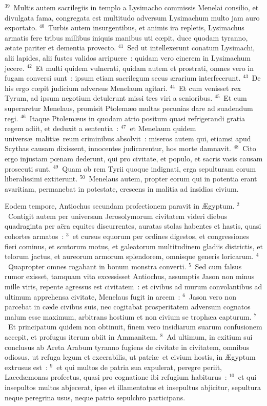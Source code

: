 ${}^{39}$~Multis autem sacrilegiis in templo a Lysimacho commissis Menelai consilio, et divulgata fama, congregata est multitudo adversum Lysimachum multo jam auro exportato.
${}^{40}$~Turbis autem insurgentibus, et animis ira repletis, Lysimachus armatis fere tribus millibus iniquis manibus uti cœpit, duce quodam tyranno, \ae tate pariter et dementia provecto.
${}^{41}$~Sed ut intellexerunt conatum Lysimachi, alii lapides, alii fustes validos arripuere~: quidam vero cinerem in Lysimachum jecere.
${}^{42}$~Et multi quidem vulnerati, quidam autem et prostrati, omnes vero in fugam conversi sunt~: ipsum etiam sacrilegum secus \ae rarium interfecerunt.
${}^{43}$~De his ergo cœpit judicium adversus Menelaum agitari.
${}^{44}$~Et cum venisset rex Tyrum, ad ipsum negotium detulerunt missi tres viri a senioribus.
${}^{45}$~Et cum superaretur Menelaus, promisit Ptolem\ae o multas pecunias dare ad suadendum regi.
${}^{46}$~Itaque Ptolem\ae us in quodam atrio positum quasi refrigerandi gratia regem adiit, et deduxit a sententia~:
${}^{47}$~et Menelaum quidem univers\ae\ maliti\ae\ reum criminibus absolvit~: miseros autem qui, etiamsi apud Scythas causam dixissent, innocentes judicarentur, hos morte damnavit.
${}^{48}$~Cito ergo injustam pœnam dederunt, qui pro civitate, et populo, et sacris vasis causam prosecuti sunt.
${}^{49}$~Quam ob rem Tyrii quoque indignati, erga sepulturam eorum liberalissimi extiterunt.
${}^{50}$~Menelaus autem, propter eorum qui in potentia erant avaritiam, permanebat in potestate, crescens in malitia ad insidias civium.

\bchapter
\lettrine[lines=3,image=true,loversize=0.05,lraise=-0.03]{E}{}odem tempore, Antiochus secundam profectionem paravit in \AE gyptum.
${}^{2}$~Contigit autem per universam Jerosolymorum civitatem videri diebus quadraginta per a\"era equites discurrentes, auratas stolas habentes et hastis, quasi cohortes armatos~:
${}^{3}$~et cursus equorum per ordines digestos, et congressiones fieri cominus, et scutorum motus, et galeatorum multitudinem gladiis districtis, et telorum jactus, et aureorum armorum splendorem, omnisque generis loricarum.
${}^{4}$~Quapropter omnes rogabant in bonum monstra converti.
${}^{5}$~Sed cum falsus rumor exisset, tamquam vita excessisset Antiochus, assumptis Jason non minus mille viris, repente agressus est civitatem~: et civibus ad murum convolantibus ad ultimum apprehensa civitate, Menelaus fugit in arcem~:
${}^{6}$~Jason vero non parcebat in c\ae de civibus suis, nec cogitabat prosperitatem adversum cognatos malum esse maximum, arbitrans hostium et non civium se troph\ae a capturum.
${}^{7}$~Et principatum quidem non obtinuit, finem vero insidiarum suarum confusionem accepit, et profugus iterum abiit in Ammanitem.
${}^{8}$~Ad ultimum, in exitium sui conclusus ab Areta Arabum tyranno fugiens de civitate in civitatem, omnibus odiosus, ut refuga legum et execrabilis, ut patri\ae\ et civium hostis, in \AE gyptum extrusus est~:
${}^{9}$~et qui multos de patria sua expulerat, peregre periit, Laced\ae monas profectus, quasi pro cognatione ibi refugium habiturus~:
${}^{10}$~et qui insepultos multos abjecerat, ipse et illamentatus et insepultus abjicitur, sepultura neque peregrina usus, neque patrio sepulchro participans.


